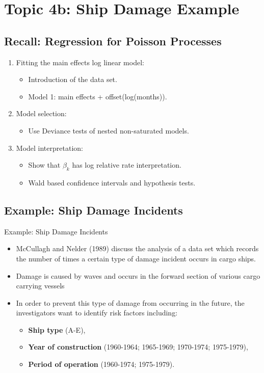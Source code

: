 \documentclass{article}\usepackage[]{graphicx}\usepackage[svgnames]{xcolor}
\begin{document}
\section*{Topic 4b: Ship Damage Example}
\subsection*{Recall: Regression for Poisson Processes}
\begin{enumerate}[1.]
      \item Fitting the main effects log linear model:
            \begin{itemize}
                  \item Introduction of the data set.
                  \item Model 1: main effects + offset(log(months)).
            \end{itemize}
      \item Model selection:
            \begin{itemize}
                  \item Use Deviance tests of nested non-saturated models.
            \end{itemize}
      \item Model interpretation:
            \begin{itemize}
                  \item Show that $ \beta_k $ has log relative rate interpretation.
                  \item Wald based confidence intervals and hypothesis tests.
            \end{itemize}
\end{enumerate}
\subsection*{Example: Ship Damage Incidents}
\begin{Example}{Example: Ship Damage Incidents}
      \begin{itemize}
            \item McCullagh and Nelder (1989) discuss the analysis of a data set which records the
                  number of times a certain type of damage incident occurs in cargo ships.
            \item Damage is caused by waves and occurs in the forward section of various cargo
                  carrying vessels
            \item In order to prevent this type of damage from occurring in the future, the
                  investigators want to identify risk factors including:
                  \begin{itemize}
                        \item \textbf{Ship type} (A-E),
                        \item \textbf{Year of construction} (1960-1964; 1965-1969; 1970-1974; 1975-1979),
                        \item \textbf{Period of operation} (1960-1974; 1975-1979).
                  \end{itemize}
      \end{itemize}
\end{Example}
\end{document}
